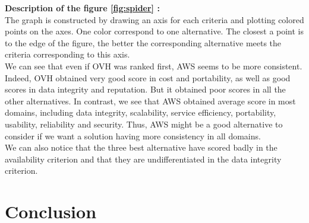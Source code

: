 \documentclass[a4paper,11pt]{article}
\begin{document}
\textbf{Description of the figure \ref{fig:spider} :}\\

The graph is constructed by drawing an axis for each criteria and plotting colored points on the axes. One color correspond to one alternative. The closest a point is to the edge of the figure, the better the corresponding alternative meets the criteria corresponding to this axis.\\

We can see that even if OVH was ranked first, AWS seems to be more consistent. Indeed, OVH obtained very good score in cost and portability, as well as good scores in data integrity and reputation. But it obtained poor scores in all the other alternatives. In contrast, we see that AWS obtained average score in most domains, including data integrity, scalability, service efficiency, portability, usability, reliability and security. Thus, AWS might be a good alternative to consider if we want a solution having more consistency in all domains. \\

We can also notice that the three best alternative have scored badly in the \og availability \fg{} criterion and that they are undifferentiated in the \og data integrity \fg{} criterion.


\section{Conclusion}
\end{document}
